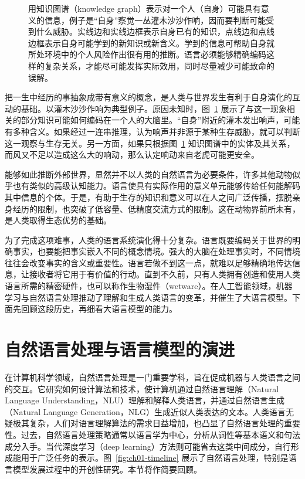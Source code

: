 \begin{figure}[!htbp]
\centering

\caption{用知识图谱（knowledge graph）表示对一个人（自身）可能具有意义的信息，例子是“自身”察觉一丛灌木沙沙作响，因而要判断可能受到什么威胁。实线边和实线边框表示自身已有的知识，点线边和点线边框表示自身可能学到的新知识或新含义。学到的信息可帮助自身就所处环境中的个人风险作出很有用的推断。语言必须能够精确编码这样的复杂关系，才能尽可能发挥实际效用，同时尽量减少可能致命的误解。}
\label{fig:ch01-graph}
\end{figure}

把一生中经历的事抽象成带有意义的概念，是人类与世界发生有利于自身演化的互动的基础。以灌木沙沙作响为典型例子。原因未知时，图~\ref{fig:ch01-graph} 展示了与这一现象相关的部分知识可能如何编码在一个人的大脑里。“自身”附近的灌木发出响声，可能有多种含义。如果经过一连串推理，认为响声并非源于某种生存威胁，就可以判断这一观察与生存无关。另一方面，如果只根据图~\ref{fig:ch01-graph} 知识图谱中的实体及其关系，而风又不足以造成这么大的响动，那么认定响动来自老虎可能更安全。

能够如此推断外部世界，显然并不以人类的自然语言为必要条件，许多其他动物似乎也有类似的高级认知能力。语言使具有实际作用的意义单元能够传给任何能解码其中信息的个体。于是，有助于生存的知识和意义可以在人之间广泛传播，摆脱亲身经历的限制，也突破了低容量、低精度交流方式的限制。这在动物界前所未有，是人类取得生态优势的基础。

为了完成这项难事，人类的语言系统演化得十分复杂。语言既要编码关于世界的明确事实，也要能把事实嵌入不同的概念情境。强大的大脑在处理事实时，不同情境往往会改变事实的含义或重要性。语言若做不到这一点，就难以足够精确地传达信息，让接收者将它用于有价值的行动。直到不久前，只有人类拥有创造和使用人类语言所需的精密硬件，也可以称作生物湿件（wetware）。在人工智能领域，机器学习与自然语言处理推动了理解和生成人类语言的变革，并催生了大语言模型。下面先回顾这段历史，再细看大语言模型的能力。

\section{自然语言处理与语言模型的演进}
在计算机科学领域，自然语言处理是一门重要学科，旨在促成机器与人类语言之间的交互。它研究如何设计算法和技术，使计算机通过自然语言理解（Natural Language Understanding，NLU）理解和解释人类语言，并通过自然语言生成（Natural Language Generation，NLG）生成近似人类表达的文本。人类语言无疑极其复杂，人们对语言理解算法的需求日益增加，也凸显了自然语言处理的重要性。过去，自然语言处理策略通常以语言学为中心，分析从词性等基本语义和句法成分入手。当代深度学习（deep learning）方法则可能省去这类中间成分，自行形成能用于广泛任务的表示。图~\ref{fig:ch01-timeline} 展示了自然语言处理，特别是语言模型发展过程中的开创性研究。本节将作简要回顾。

